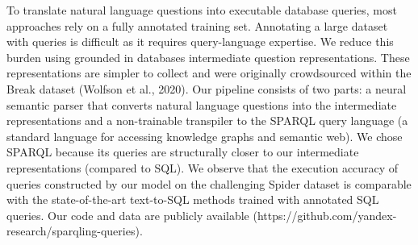 To translate natural language questions into executable database queries, most approaches rely on a fully annotated training set. Annotating a large dataset with queries is difficult as it requires query-language expertise. We reduce this burden using grounded in databases intermediate question representations. These representations are simpler to collect and were originally crowdsourced within the Break dataset (Wolfson et al., 2020). Our pipeline consists of two parts: a neural semantic parser that converts natural language questions into the intermediate representations and a non-trainable transpiler to the SPARQL query language (a standard language for accessing knowledge graphs and semantic web). We chose SPARQL because its queries are structurally closer to our intermediate representations (compared to SQL). We observe that the execution accuracy of queries constructed by our model on the challenging Spider dataset is comparable with the state-of-the-art text-to-SQL methods trained with annotated SQL queries. Our code and data are publicly available (https://github.com/yandex-research/sparqling-queries).
